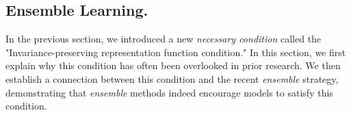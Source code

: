 \subsection{Ensemble Learning.} 



\label{sec:sufficient_constraint}
In the previous section, we introduced a new \textit{necessary condition} called the "Invariance-preserving representation function condition." In this section, we first explain why this condition has often been overlooked in prior research. We then establish a connection between this condition and the recent \textit{ensemble} strategy, demonstrating that \textit{ensemble} methods indeed encourage models to satisfy this condition.



